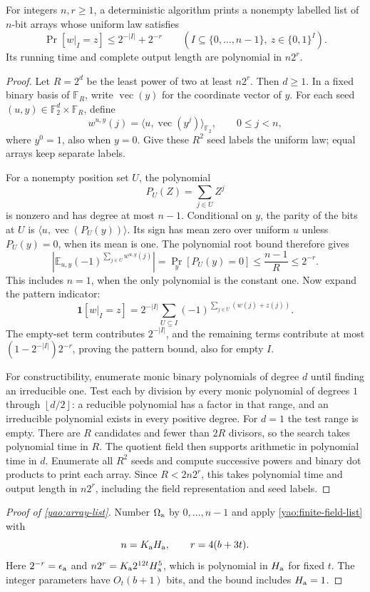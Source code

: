 \documentclass[11pt]{article} \usepackage[utf8]{inputenc}
\theoremstyle{plain} \newtheorem{theorem}{Theorem}[section]
\theoremstyle{definition} \newaliascnt{definition}{theorem}
\newcommand{\floor}[1]{\left\lfloor#1\right\rfloor}
\newcommand{\ind}{\mathbf{1}}
\begin{document}
\begin{lemma}\label{yao:finite-field-list}
For integers $n,r\ge1$, a deterministic algorithm prints a nonempty labelled
list of $n$-bit arrays whose uniform law satisfies
\[
\Pr[w|_I=z]\le2^{-|I|}+2^{-r}
\qquad(I\subseteq\{0,\ldots,n-1\},\ z\in\{0,1\}^I).
\]
Its running time and complete output length are polynomial in $n2^r$.
\end{lemma}
\begin{proof}
Let $R=2^d$ be the least power of two at least $n2^r$. Then $d\ge1$.
In a fixed binary basis of $\mathbb F_R$, write $\operatorname{vec}(y)$ for
the coordinate vector of $y$. For each seed
$(u,y)\in\mathbb F_2^d\times\mathbb F_R$, define
\[
w^{u,y}(j)=\langle u,\operatorname{vec}(y^j)\rangle_{\mathbb F_2},
\qquad 0\le j<n,
\]
where $y^0=1$, also when $y=0$. Give these $R^2$ seed labels the uniform law;
equal arrays keep separate labels.

For a nonempty position set $U$, the polynomial
\[
P_U(Z)=\sum_{j\in U}Z^j
\]
is nonzero and has degree at most $n-1$. Conditional on $y$, the parity of the
bits at $U$ is $\langle u,\operatorname{vec}(P_U(y))\rangle$. Its sign has
mean zero over uniform $u$ unless $P_U(y)=0$, when its mean is one. The
polynomial root bound therefore gives
\[
\left|\mathbb E_{u,y}(-1)^{\sum_{j\in U}w^{u,y}(j)}\right|
=\Pr_y[P_U(y)=0]\le\frac{n-1}{R}\le2^{-r}.
\]
This includes $n=1$, when the only polynomial is the constant one.
Now expand the pattern indicator:
\[
\ind[w|_I=z]=2^{-|I|}\sum_{U\subseteq I}
(-1)^{\sum_{j\in U}(w(j)+z(j))}.
\]
The empty-set term contributes $2^{-|I|}$, and the remaining terms contribute
at most $(1-2^{-|I|})2^{-r}$, proving the pattern bound, also for empty $I$.

For constructibility, enumerate monic binary polynomials of degree $d$ until
finding an irreducible one. Test each by division by every monic polynomial of
degrees $1$ through $\floor{d/2}$: a reducible polynomial has a factor in that
range, and an irreducible polynomial exists in every positive degree. For
$d=1$ the test range is empty. There are $R$ candidates and fewer than $2R$
divisors, so the search takes polynomial time in $R$. The quotient field then
supports arithmetic in polynomial time in $d$. Enumerate all $R^2$ seeds and
compute successive powers and binary dot products to print each array.
Since $R<2n2^r$, this takes polynomial time and output length in $n2^r$,
including the field representation and seed labels.
\end{proof}

\begin{proof}[Proof of \cref{yao:array-list}]
Number $\Omega_{\rm a}$ by $0,\ldots,n-1$ and apply
\cref{yao:finite-field-list} with
\[
n=K_{\rm a}H_{\rm a},\qquad r=4(b+3t).
\]
Here $2^{-r}=\epsilon_{\rm a}$ and
$n2^r=K_{\rm a}2^{12t}H_{\rm a}^5$, which is polynomial in $H_{\rm a}$
for fixed $t$. The integer parameters have $O_t(b+1)$ bits, and the bound
includes $H_{\rm a}=1$.
\end{proof}



\end{document}
